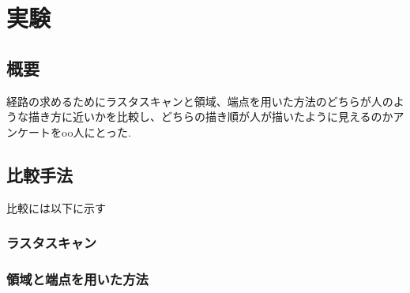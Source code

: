 \chapter{実験}
  \label{chap:experiment}
  \section{概要}
    \label{sec:summary}
	経路の求めるためにラスタスキャンと領域、端点を用いた方法のどちらが人のような描き方に近いかを比較し、どちらの描き順が人が描いたように見えるのかアンケートをoo人にとった.
  
  \section{比較手法}
    \label{sec:compare}
    比較には以下に示す
    \subsection{ラスタスキャン}
      \label{subsec:rastascan}

    \subsection{領域と端点を用いた方法}
      \label{subsec:mymethod}
